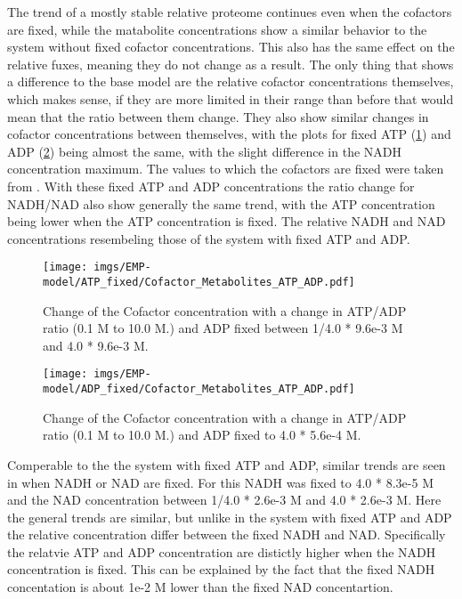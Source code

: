 The trend of a mostly stable relative proteome continues even when the cofactors are fixed, while the matabolite concentrations show a similar behavior to the system without fixed cofactor concentrations. This also has the same effect on the relative fuxes, meaning they do not change as a result. The only thing that shows a difference to the base model are the relative cofactor concentrations themselves, which makes sense, if they are more limited in their range than before that would mean that the ratio between them change. They also show similar changes in cofactor concentrations between themselves, with the plots for fixed ATP (\ref{fig:cofactor_atp_fixed_atp}) and ADP (\ref{fig:cofactor_adp_fixed_atp}) being almost the same, with the slight difference in the NADH concentration maximum. 
The values to which the cofactors are fixed were taken from \cite{bennett2009absolute}. With these fixed ATP and ADP concentrations the ratio change for NADH/NAD also show generally the same trend, with the ATP concentration being lower when the ATP concentration is fixed. The relative NADH and NAD concentrations resembeling those of the system with fixed ATP and ADP.
\begin{figure}[H]
    \centering
    \texttt{[image: imgs/EMP-model/ATP\_fixed/Cofactor\_Metabolites\_ATP\_ADP.pdf]}
    \caption{Change of the Cofactor concentration with a change in ATP/ADP ratio (0.1 M to 10.0 M.) and ADP fixed between 1/4.0 * 9.6e-3 M and 4.0 * 9.6e-3 M.}
    \label{fig:cofactor_atp_fixed_atp}
\end{figure}

\begin{figure}[H]
    \centering
    \texttt{[image: imgs/EMP-model/ADP\_fixed/Cofactor\_Metabolites\_ATP\_ADP.pdf]}
    \caption{Change of the Cofactor concentration with a change in ATP/ADP ratio (0.1 M to 10.0 M.) and ADP fixed to 4.0 * 5.6e-4 M.}
    \label{fig:cofactor_adp_fixed_atp}
\end{figure}

Comperable to the the system with fixed ATP and ADP, similar trends are seen in when NADH or NAD are fixed. For this NADH was fixed to 4.0 * 8.3e-5 M and the NAD concentration between 1/4.0 * 2.6e-3 M and 4.0 * 2.6e-3 M. Here the general trends are similar, but unlike in the system with fixed ATP and ADP the relative concentration differ between the fixed NADH and NAD. Specifically the relatvie ATP and ADP concentration are distictly higher when the NADH concentration is fixed. This can be explained by the fact that the fixed NADH concentation is about 1e-2 M lower than the fixed NAD concentartion.

